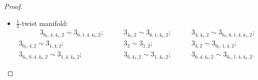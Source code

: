 \documentclass{amsart}
\theoremstyle{definition}
\theoremstyle{remark}
\begin{document}
\begin{proof}
\begin{itemize}
        Moreover we have:
        \begin{align*}
            7 \cap_2 7_{1}; \quad \quad
             7_6 \cap_2 7_{6,1}; \quad \quad
             7_{6_5} \cap_2 7_{6_5,1}; \quad \quad
             7_{6_5,6} \cap_2 7_{6_5,6,1}.
        \end{align*}

    

        Putting together the results of the three gluings for the torus, we have the thesis for $R_T$. We proceed similarly for the other cases.


        \item $\frac{1}{2}$-twist manifold:
        \begin{align*}
            \quad \quad \quad 3_{6_5,4,4_5,2} \sim 3_{6,1,4,4_5,2}; \quad \quad
            & 3_{4_5,2} \sim 3_{6,1,4_5,2}; \quad \quad
            & 3_{4,4_5,2} \sim 3_{6_5,6,1,4,4_5,2}; \\
            3_{6_5,4,2} \sim 3_{1,4,2}; \quad \quad
            & 3_{2} \sim 3_{1,2}; \quad \quad
            & 3_{4,2} \sim 3_{6_5,1,4,2}; \\
            3_{6_5,6,4,4_5,2} \sim 3_{1,4,4_5,2}; \quad \quad
            & 3_{6,4_5,2} \sim 3_{1,4_5,2}; \quad \quad
            & 3_{6,4,4_5,2} \sim 3_{6_5,1,4,4_5,2}.
        \end{align*}




\end{itemize}
\end{proof}
\end{document}
